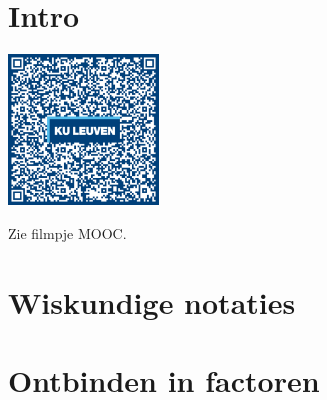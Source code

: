 
\section*{Intro}
\begin{minipage}{.25\linewidth}
	\raggedright
	\includegraphics[width=4cm]{1_elem_rekenvaardigheden_A/inputs/QR_Code_INTRO_module_1new}
\end{minipage}
\begin{minipage}{.7\linewidth}
Zie filmpje MOOC.
\end{minipage}


\section{Wiskundige notaties}




\section{Ontbinden in factoren}
\label{sec:ontbindeninfactoren}
